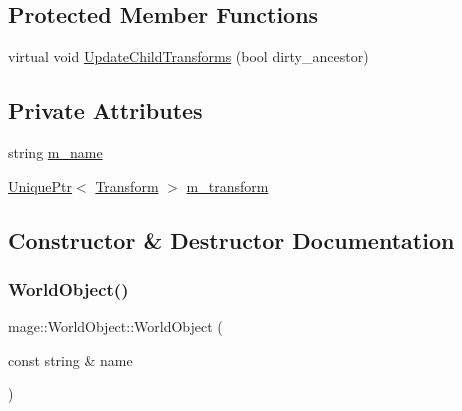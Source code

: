 \subsection*{Protected Member Functions}
\begin{DoxyCompactItemize}
\item 
virtual void \hyperlink{classmage_1_1_world_object_ab384751f7c14c931e8606f927825b6c8}{Update\+Child\+Transforms} (bool dirty\+\_\+ancestor)
\end{DoxyCompactItemize}
\subsection*{Private Attributes}
\begin{DoxyCompactItemize}
\item 
string \hyperlink{classmage_1_1_world_object_a383cc5e1275f389459021a16b958049c}{m\+\_\+name}
\item 
\hyperlink{namespacemage_a8c307fbcc33bce9b7f2aa4c26c3b95cf}{Unique\+Ptr}$<$ \hyperlink{structmage_1_1_transform}{Transform} $>$ \hyperlink{classmage_1_1_world_object_aa9b856a22731a70f9200e79d0f9a45ee}{m\+\_\+transform}
\end{DoxyCompactItemize}


\subsection{Constructor \& Destructor Documentation}
\hypertarget{classmage_1_1_world_object_a40d714ae9da1e197171c55f8fd321cc4}{}\label{classmage_1_1_world_object_a40d714ae9da1e197171c55f8fd321cc4} 
\subsubsection{\texorpdfstring{World\+Object()}{WorldObject()}\hspace{0.1cm}{\footnotesize\ttfamily [1/3]}}
{\footnotesize\ttfamily mage\+::\+World\+Object\+::\+World\+Object (\begin{DoxyParamCaption}\item[{const string \&}]{name }\end{DoxyParamCaption})\hspace{0.3cm}{\ttfamily [explicit]}}

\hypertarget{classmage_1_1_world_object_a4e7ace41518b45c75d975c766de28143}{}\label{classmage_1_1_world_object_a4e7ace41518b45c75d975c766de28143} 

